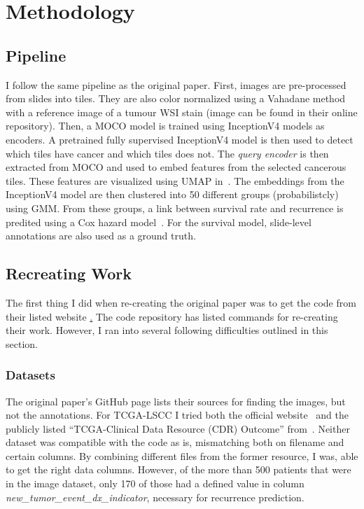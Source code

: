 \documentclass[10pt,twocolumn,letterpaper]{article}
\begin{document}
\section{Methodology}\label{sec:methodology}
\subsection{Pipeline}
I follow the same pipeline as the original paper. First, images are pre-processed from slides into tiles. They are also color normalized using a Vahadane method~\cite{vahadane} with a reference image of a tumour WSI stain (image can be found in their online repository). Then, a \gls{MOCO} model is trained using InceptionV4 models as encoders. A pretrained fully supervised InceptionV4 model is then used to detect which tiles have cancer and which tiles does not. The \textit{query encoder} is then extracted from \gls{MOCO} and used to embed features from the selected cancerous tiles. These features are visualized using \gls{UMAP} in~. The embeddings from the InceptionV4 model are then clustered into 50 different groups (probabilistcly) using \gls{GMM}. From these groups, a link between survival rate and recurrence is predited using a Cox hazard model~\cite{cox1972regression}. For the survival model, slide-level annotations are also used as a ground truth.

\subsection{Recreating Work}
The first thing I did when re-creating the original paper was to get the code from their listed website \href{https://github.com/NYUMedML/conditional_ssl_hist}. The code repository has listed commands for re-creating their work. However, I ran into several following difficulties outlined in this section.

\subsubsection{Datasets}
The original paper's GitHub page lists their sources for finding the images, but not the annotations. For \gls{TCGA}-\gls{LSCC} I tried both the official website~\cite{tcgaAnnotation} and the publicly listed ``\gls{TCGA}-Clinical Data Resource (CDR) Outcome'' from~\cite{pancan}. Neither dataset was compatible with the code as is, mismatching both on filename and certain columns. By combining different files from the former resource, I was, able to get the right data columns. However, of the more than 500 patients that were in the image dataset, only 170 of those had a defined value in column \textit{new\_tumor\_event\_dx\_indicator}, necessary for recurrence prediction. 
\end{document}
